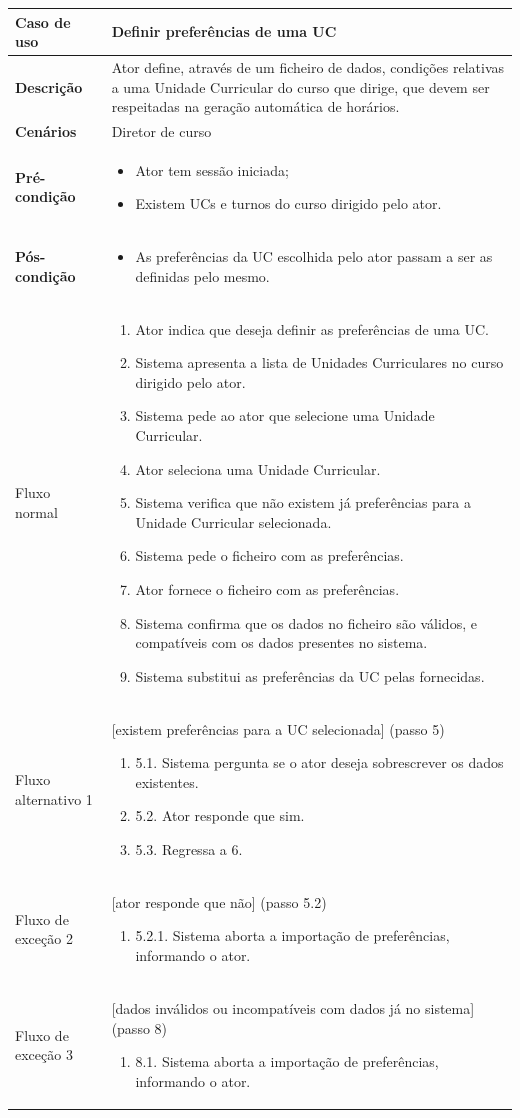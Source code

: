 \documentclass[12pt, a4paper]{article}
\newenvironment{condition}{
    \begin{itemize}[wide=0pt]
        \vspace{-0.2cm}
}{
        \vspace{-0.5cm}
    \end{itemize}
}
\newcommand\flow[1]{
    Fluxo normal &
    \singlespacing
    \begin{enumerate}[wide=0pt]
        #1
        \vspace{-0.3cm}
    \end{enumerate} \\ \hline
}
\newcommand\otherflow[3]{
    #1 &
    #2
    \singlespacing
    \begin{enumerate}[wide=0pt]
        #3
        \vspace{-0.3cm}
    \end{enumerate} \\ \hline
}
\newenvironment{usecase}[5]{
    \begin{table}[H]
        \centering
        \begin{tabular}{|>{\centering\arraybackslash\bf}m{3cm}|m{13cm}|}
            \hline
            Caso de uso & \textbf{#1} \\

            \hline
            Descrição & #2 \\

            \hline
            Cenários & #3 \\

            \hline
            Pré-condição &
            \begin{condition}
                #4
            \end{condition} \\

            \hline
            Pós-condição &
            \begin{condition}
                #5
            \end{condition} \\

            \hline
}{
    \end{tabular}
\end{table}
}
\begin{document}
\begin{usecase}
    {Definir preferências de uma UC}
    {
        Ator define, através de um ficheiro de dados, condições relativas a uma Unidade Curricular
        do curso que dirige, que devem ser respeitadas na geração automática de horários.
    }
    {Diretor de curso}
    {
        \item Ator tem sessão iniciada;
        \item Existem UCs e turnos do curso dirigido pelo ator.
    }
    {\item As preferências da UC escolhida pelo ator passam a ser as definidas pelo mesmo.}

    \flow{
        \item Ator indica que deseja definir as preferências de uma UC.
        \item Sistema apresenta a lista de Unidades Curriculares no curso dirigido pelo ator.
        \item Sistema pede ao ator que selecione uma Unidade Curricular.
        \item Ator seleciona uma Unidade Curricular.
        \item Sistema verifica que não existem já preferências para a Unidade Curricular
            selecionada.
        \item Sistema pede o ficheiro com as preferências.
        \item Ator fornece o ficheiro com as preferências.
        \item Sistema confirma que os dados no ficheiro são válidos, e compatíveis com os dados
            presentes no sistema.
        \item Sistema substitui as preferências da UC pelas fornecidas.
    }

    \otherflow{Fluxo alternativo 1}{[existem preferências para a UC selecionada] (passo 5)}{
        \item[5.1.] Sistema pergunta se o ator deseja sobrescrever os dados existentes.
        \item[5.2.] Ator responde que sim.
        \item[5.3.] Regressa a 6.
    }

    \otherflow{Fluxo de exceção 2}{[ator responde que não] (passo 5.2)}{
        \item[5.2.1.] Sistema aborta a importação de preferências, informando o ator.
    }

    \otherflow{Fluxo de exceção 3}
        {[dados inválidos ou incompatíveis com dados já no sistema] (passo 8)}{

        \item[8.1.] Sistema aborta a importação de preferências, informando o ator.
    }
\end{usecase}
\end{document}
